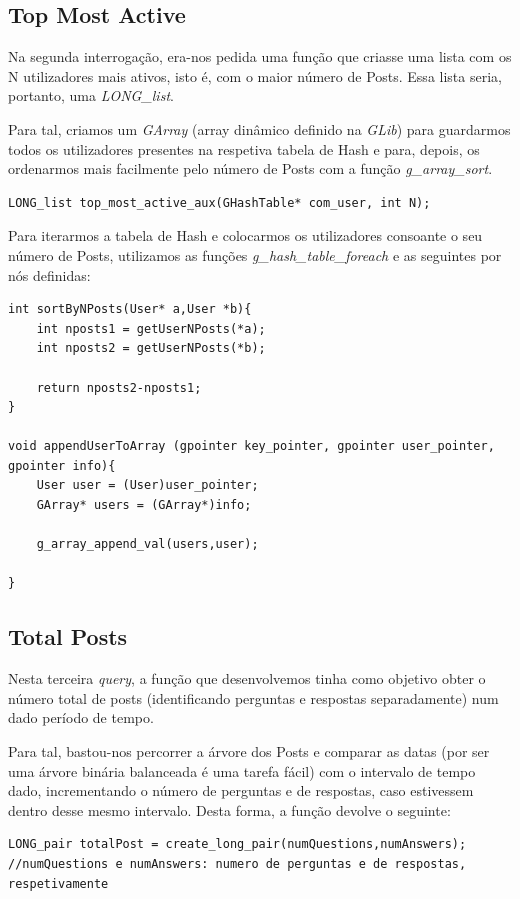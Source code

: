 \documentclass[a4paper, 11pt, oneside]{article}
\begin{document}
\subsection{Top Most Active}
Na segunda interrogação, era-nos pedida uma função que criasse uma lista com os N utilizadores mais ativos, isto é, com o maior número de Posts. Essa lista seria, portanto, uma \textit{LONG\_list}.

Para tal, criamos um \textit{GArray} (array dinâmico definido na \textit{GLib}) para guardarmos todos os utilizadores presentes na respetiva tabela de Hash e para, depois, os ordenarmos mais facilmente pelo número de Posts com a função \textit{g\_array\_sort}.
\begin{lstlisting}[caption=Query 2 - tipo da função auxiliar]
LONG_list top_most_active_aux(GHashTable* com_user, int N);
\end{lstlisting}

Para iterarmos a tabela de Hash e colocarmos os utilizadores consoante o seu número de Posts, utilizamos as funções \textit{g\_hash\_table\_foreach} e as seguintes por nós definidas:
\begin{lstlisting}[caption= Query 2 - funções auxiliares]
int sortByNPosts(User* a,User *b){
	int nposts1 = getUserNPosts(*a);
	int nposts2 = getUserNPosts(*b);
	
	return nposts2-nposts1;
}

void appendUserToArray (gpointer key_pointer, gpointer user_pointer, gpointer info){	
	User user = (User)user_pointer;
	GArray* users = (GArray*)info;

	g_array_append_val(users,user);

}
\end{lstlisting}

\subsection{Total Posts}
Nesta terceira \textit{query}, a função que desenvolvemos tinha como objetivo obter o número
total de posts (identificando perguntas e respostas separadamente) num dado período de tempo.

Para tal, bastou-nos percorrer a árvore dos Posts e comparar as datas (por ser uma árvore binária balanceada é uma tarefa fácil) com o intervalo de tempo dado, incrementando o número de perguntas e de respostas, caso estivessem dentro desse mesmo intervalo.
Desta forma, a função devolve o seguinte:
\begin{lstlisting}[caption=Query 3 - resultado a devolver]
LONG_pair totalPost = create_long_pair(numQuestions,numAnswers); //numQuestions e numAnswers: numero de perguntas e de respostas, respetivamente
\end{lstlisting}
\end{document}
